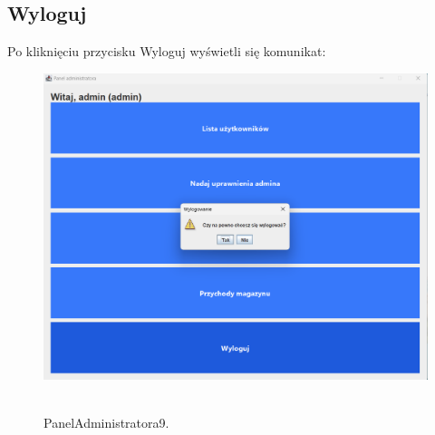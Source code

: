 \subsection{Wyloguj}
\label{subsec:Wyloguj}

Po kliknięciu przycisku Wyloguj wyświetli się komunikat:

\begin{figure}[H]
    \centering
    \includegraphics[width=.9\linewidth]{figures/PanelAdministratora9.png}\
    \caption{PanelAdministratora9.\label{PanelAdministratora9}}
\end{figure}